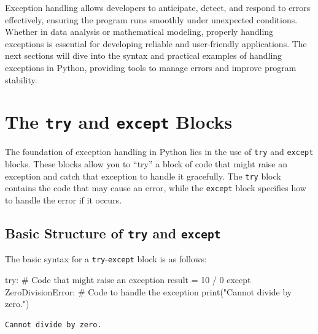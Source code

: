 \documentclass[
  letterpaper,
  DIV=11,
  numbers=noendperiod]{scrreprt}
\newenvironment{Shaded}{\begin{snugshade}}{\end{snugshade}}
\newcommand{\BuiltInTok}[1]{\textcolor[rgb]{0.00,0.23,0.31}{#1}}
\newcommand{\CommentTok}[1]{\textcolor[rgb]{0.37,0.37,0.37}{#1}}
\newcommand{\ControlFlowTok}[1]{\textcolor[rgb]{0.00,0.23,0.31}{#1}}
\newcommand{\DecValTok}[1]{\textcolor[rgb]{0.68,0.00,0.00}{#1}}
\newcommand{\NormalTok}[1]{\textcolor[rgb]{0.00,0.23,0.31}{#1}}
\newcommand{\OperatorTok}[1]{\textcolor[rgb]{0.37,0.37,0.37}{#1}}
\newcommand{\PreprocessorTok}[1]{\textcolor[rgb]{0.68,0.00,0.00}{#1}}
\newcommand{\StringTok}[1]{\textcolor[rgb]{0.13,0.47,0.30}{#1}}
\begin{document}
Exception handling allows developers to anticipate, detect, and respond
to errors effectively, ensuring the program runs smoothly under
unexpected conditions. Whether in data analysis or mathematical
modeling, properly handling exceptions is essential for developing
reliable and user-friendly applications. The next sections will dive
into the syntax and practical examples of handling exceptions in Python,
providing tools to manage errors and improve program stability.

\hypertarget{the-try-and-except-blocks}{%
\section{\texorpdfstring{The \texttt{try} and \texttt{except}
Blocks}{The try and except Blocks}}\label{the-try-and-except-blocks}}

The foundation of exception handling in Python lies in the use of
\texttt{try} and \texttt{except} blocks. These blocks allow you to
``try'' a block of code that might raise an exception and catch that
exception to handle it gracefully. The \texttt{try} block contains the
code that may cause an error, while the \texttt{except} block specifies
how to handle the error if it occurs.

\hypertarget{basic-structure-of-try-and-except}{%
\subsection{\texorpdfstring{Basic Structure of \texttt{try} and
\texttt{except}}{Basic Structure of try and except}}\label{basic-structure-of-try-and-except}}

The basic syntax for a \texttt{try}-\texttt{except} block is as follows:

\begin{Shaded}
\begin{Highlighting}[]
\ControlFlowTok{try}\NormalTok{:}
    \CommentTok{\# Code that might raise an exception}
\NormalTok{    result }\OperatorTok{=} \DecValTok{10} \OperatorTok{/} \DecValTok{0}
\ControlFlowTok{except} \PreprocessorTok{ZeroDivisionError}\NormalTok{:}
    \CommentTok{\# Code to handle the exception}
    \BuiltInTok{print}\NormalTok{(}\StringTok{"Cannot divide by zero."}\NormalTok{)}
\end{Highlighting}
\end{Shaded}

\begin{verbatim}
Cannot divide by zero.
\end{verbatim}
\end{document}
